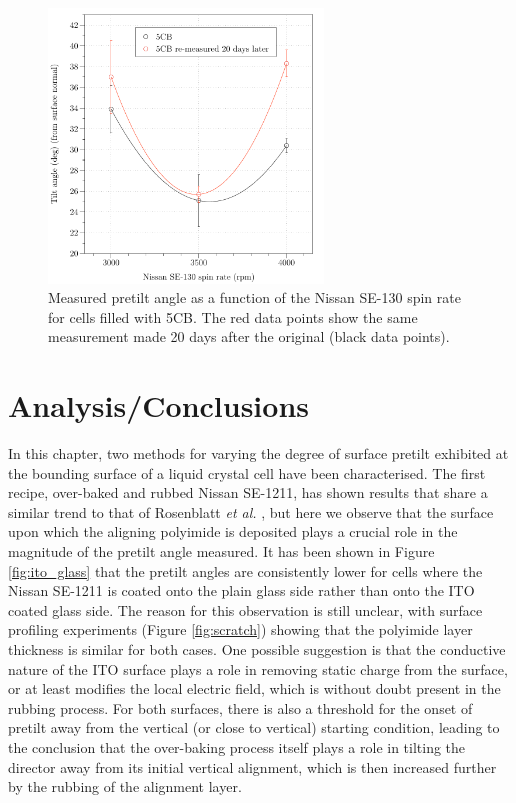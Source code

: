 \begin{figure}
\begin{center}
\includegraphics[width=0.65\textwidth]{Figures/Pretilt/double_polyimide_5cb}
\end{center}
\caption[Pretilt angle as a function of rubbing strength for 5CB]{\label{fig:double_polyimide_5cb} Measured pretilt angle as a function of the Nissan SE-130 spin rate for cells filled with 5CB. The red data points show the same measurement made 20 days after the original (black data points).}
\end{figure}

\section{Analysis/Conclusions}
\label{sec:pretilt_analysis}

In this chapter, two methods for varying the degree of surface pretilt exhibited at the bounding surface of a liquid crystal cell have been characterised. The first recipe, over-baked and rubbed Nissan SE-1211, has shown results that share a similar trend to that of Rosenblatt \textit{et al.} \cite{Wang2007,Huang2005}, but here we observe that the surface upon which the aligning polyimide is deposited plays a crucial role in the magnitude of the pretilt angle measured. It has been shown in Figure \ref{fig:ito_glass} that the pretilt angles are consistently lower for cells where the Nissan SE-1211 is coated onto the plain glass side rather than onto the ITO coated glass side. The reason for this observation is still unclear, with surface profiling experiments (Figure \ref{fig:scratch}) showing that the polyimide layer thickness is similar for both cases. One possible suggestion is that the conductive nature of the ITO surface plays a role in removing static charge from the surface, or at least modifies the local electric field, which is without doubt present in the rubbing process. For both surfaces, there is also a threshold for the onset of pretilt away from the vertical (or close to vertical) starting condition, leading to the conclusion that the over-baking process itself plays a role in tilting the director away from its initial vertical alignment, which is then increased further by the rubbing of the alignment layer.
 
